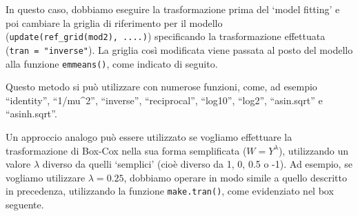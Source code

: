 \documentclass[
  12pt,
]{book}
\newenvironment{Shaded}{\begin{snugshade}}{\end{snugshade}}
\newcommand{\AttributeTok}[1]{\textcolor[rgb]{0.77,0.63,0.00}{#1}}
\newcommand{\DecValTok}[1]{\textcolor[rgb]{0.00,0.00,0.81}{#1}}
\newcommand{\DocumentationTok}[1]{\textcolor[rgb]{0.56,0.35,0.01}{\textbf{\textit{#1}}}}
\newcommand{\FunctionTok}[1]{\textcolor[rgb]{0.00,0.00,0.00}{#1}}
\newcommand{\NormalTok}[1]{#1}
\newcommand{\OtherTok}[1]{\textcolor[rgb]{0.56,0.35,0.01}{#1}}
\newcommand{\SpecialCharTok}[1]{\textcolor[rgb]{0.00,0.00,0.00}{#1}}
\newcommand{\StringTok}[1]{\textcolor[rgb]{0.31,0.60,0.02}{#1}}
\begin{document}
In questo caso, dobbiamo eseguire la trasformazione prima del `model fitting' e poi cambiare la griglia di riferimento per il modello (\texttt{update(ref\_grid(mod2),\ ....)}) specificando la trasformazione effettuata (\texttt{tran\ =\ "inverse"}). La griglia così modificata viene passata al posto del modello alla funzione \texttt{emmeans()}, come indicato di seguito.

\begin{Shaded}
\end{Shaded}

Questo metodo si può utilizzare con numerose funzioni, come, ad esempio ``identity'', ``1/mu\^{}2'', ``inverse'', ``reciprocal'', ``log10'', ``log2'', ``asin.sqrt'' e ``asinh.sqrt''.

Un approccio analogo può essere utilizzato se vogliamo effettuare la trasformazione di Box-Cox nella sua forma semplificata (\(W = Y^{\lambda}\)), utilizzando un valore \(\lambda\) diverso da quelli `semplici' (cioè diverso da 1, 0, 0.5 o -1). Ad esempio, se vogliamo utilizzare \(\lambda = 0.25\), dobbiamo operare in modo simile a quello descritto in precedenza, utilizzando la funzione \texttt{make.tran()}, come evidenziato nel box seguente.
\end{document}
